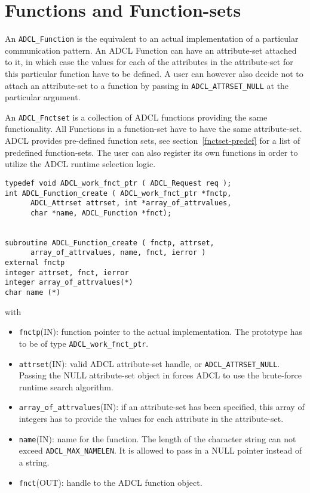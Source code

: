 \section{Functions and Function-sets}

An {\tt ADCL\_Function} is the equivalent to an actual implementation of a particular communication pattern. An ADCL Function can have an attribute-set attached to it, in which case the values for each of the attributes in the attribute-set for this particular function have to be defined. A user can however also decide not to attach an attribute-set to a function by passing in {\tt ADCL\_ATTRSET\_NULL} at the particular argument.

An {\tt ADCL\_Fnctset} is a collection of ADCL functions providing the same functionality. All Functions in a function-set have to have the same attribute-set. ADCL provides pre-defined function sets, see section~\ref{fnctset-predef} for a list of predefined function-sets. The user can also register its own functions in order to utilize the ADCL runtime selection logic.

\begin{verbatim}
typedef void ADCL_work_fnct_ptr ( ADCL_Request req );
int ADCL_Function_create ( ADCL_work_fnct_ptr *fnctp, 
      ADCL_Attrset attrset, int *array_of_attrvalues,  
      char *name, ADCL_Function *fnct);


subroutine ADCL_Function_create ( fnctp, attrset, 
      array_of_attrvalues, name, fnct, ierror )
external fnctp
integer attrset, fnct, ierror
integer array_of_attrvalues(*)
char name (*)	                                

\end{verbatim}
with
\begin{itemize}
\item {\tt fnctp}(IN): function pointer to the actual implementation. The prototype has
     to be of type {\tt ADCL\_work\_fnct\_ptr}.
\item {\tt attrset}(IN): valid ADCL attribute-set handle, or {\tt ADCL\_ATTRSET\_NULL}. Passing the NULL attribute-set 
   object in forces ADCL to use the brute-force runtime search algorithm.
\item {\tt array\_of\_attrvalues}(IN): if an attribute-set has been specified, this array of
 integers has to provide the values for each attribute in the attribute-set. 
\item {\tt name}(IN): name for the function. The length of the character string can not exceed 
   {\tt ADCL\_MAX\_NAMELEN}. It is allowed to pass in a NULL pointer instead of a string.
\item {\tt fnct}(OUT): handle to the ADCL function object.
\end{itemize}

